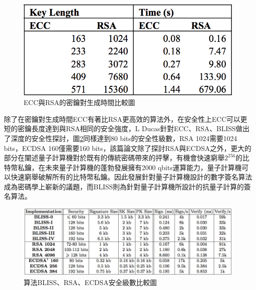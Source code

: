 			\begin{figure}[h]
				\centering
				\includegraphics[width = .5\textwidth]{ECCtime.png}
				\caption{ECC與RSA的密鑰對生成時間比較圖\supercite{Performancecomparisonofellipticcurveandrsadigitalsignatures}}\label{ECCtime}
			\end{figure}

			除了在密鑰對生成時間ECC有著比RSA更高效的算法外，在安全性上ECC可以更短的密鑰長度達到與RSA相同的安全強度，L Ducas針對ECC、RSA、BLISS\supercite{LatticesignaturesandbimodalGaussians}做出了深度的安全性探討\supercite{LatticesignaturesandbimodalGaussians}，圖\ref{LatticesignaturesandbimodalGaussians}同樣達到80 bits的安全性級數，RSA 1024需要1024 bits，ECDSA 160\supercite{DeploymentsofEllipticCurveCryptography}僅需要160 bits，該篇論文除了探討RSA與ECDSA之外，更大的部分在闡述量子計算機對於既有的傳統密碼帶來的抨擊，有機會快速窮舉$2^{256}$的比特幣私鑰，在未來量子計算機的蓬勃發展擁有2000 qbits運算能力，量子計算機可以快速窮舉破解所有的比特幣私鑰。因此發展針對量子計算機設計的數字簽名算法成為密碼學上嶄新的議題，而BLISS則為針對量子計算機所設計的抗量子計算的簽名算法。

			\begin{figure}[h]
				\centering
				\includegraphics[width = 1\textwidth]{LatticesignaturesandbimodalGaussians.png}
				\caption{算法BLISS、RSA、ECDSA安全級數比較圖\supercite{LatticesignaturesandbimodalGaussians}}\label{LatticesignaturesandbimodalGaussians}
			\end{figure}

%

